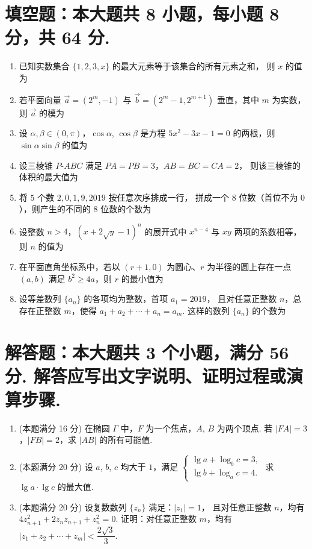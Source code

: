 \documentclass{chsmc}
\begin{document}
\section{填空题：本大题共 8 小题，每小题 8 分，共 64 分.}

\begin{enumerate}
  \item 已知实数集合 $\{1, 2, 3, x\}$ 的最大元素等于该集合的所有元素之和，
    则 $x$ 的值为 \blankline
  \item 若平面向量 $\vec{a} = (2^m, -1)$ 与
    $\vec{b} = (2^m - 1, 2^{m+1})$ 垂直，其中 $m$ 为实数，
    则 $\vec{a}$ 的模为 \blankline
  \item 设 $\alpha, \beta \in (0,\pi)$，$\cos\alpha$, $\cos\beta$
    是方程 $5x^2 - 3x - 1 = 0$ 的两根，则 $\sin\alpha\sin\beta$ 的值为 \blankline
  \item 设三棱锥 $P$-$ABC$ 满足 $PA = PB = 3$，$AB = BC = CA = 2$，
    则该三棱锥的体积的最大值为 \blankline
  \item 将 $5$ 个数 $2, 0, 1, 9, 2019$ 按任意次序排成一行，
    拼成一个 $8$ 位数（首位不为 $0$），则产生的不同的 $8$ 位数的个数为 \blankline
  \item 设整数 $n > 4$，$(x + 2\sqrt{y} - 1)^n$ 的展开式中 $x^{n-4}$ 与 $xy$
    两项的系数相等，则 $n$ 的值为 \blankline
  \item 在平面直角坐标系中，若以 $(r+1,0)$ 为圆心、$r$ 为半径的圆上存在一点
    $(a,b)$ 满足 $b^2 \geqslant 4a$，则 $r$ 的最小值为 \blankline
  \item 设等差数列 $\{a_n\}$ 的各项均为整数，首项 $a_1 = 2019$，
    且对任意正整数 $n$，总存在正整数 $m$，使得
    $a_1 + a_2 + \cdots + a_n = a_m$. 这样的数列 $\{a_n\}$ 的个数为 \blankline
\end{enumerate}

\section{解答题：本大题共 3 个小题，满分 56 分. 解答应写出文字说明、证明过程或演算步骤.}

\begin{enumerate}[resume]
  \item (本题满分 16 分) 在椭圆 $\Gamma$ 中，$F$ 为一个焦点，$A$, $B$ 为两个顶点.
    若 $|FA| = 3$，$|FB| = 2$，求 $|AB|$ 的所有可能值.
  \item (本题满分 20 分) 设 $a$, $b$, $c$ 均大于 $1$，满足
    $\begin{cases}
      \lg a + \log_b c = 3, \\
      \lg b + \log_a c = 4.
    \end{cases}$
    求 $\lg a \cdot \lg c$ 的最大值.
  \item (本题满分 20 分) 设复数数列 $\{z_n\}$ 满足：$|z_1| = 1$，
    且对任意正整数 $n$，均有 $4z_{n+1}^2 + 2z_n z_{n+1} + z_n^2 = 0$.
    证明：对任意正整数 $m$，均有
    $|z_1 + z_2 + \cdots + z_m| < \dfrac{2\sqrt{3}}{3}$.
\end{enumerate}
\end{document}
